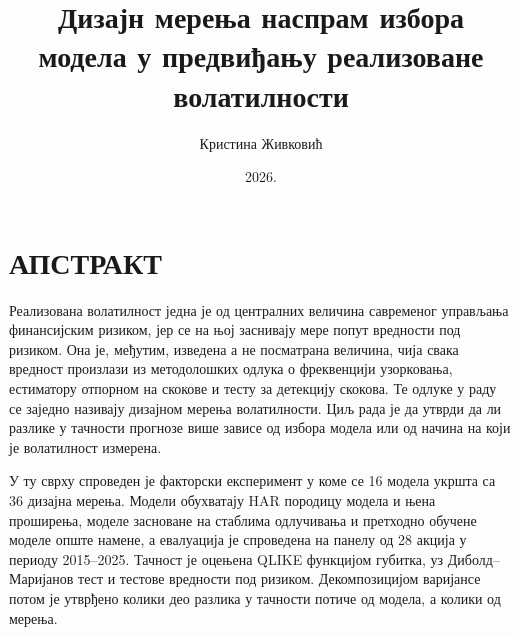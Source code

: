 \documentclass[12pt,a4paper,oneside]{report}
\title{Дизајн мерења наспрам избора модела у предвиђању реализоване волатилности}
\author{Кристина Живковић}
\date{2026.}
\begin{document}


\chapter*{АПСТРАКТ}

Реализована волатилност једна је од централних величина савременог управљања
финансијским ризиком, јер се на њој заснивају мере попут вредности под ризиком. Она је,
међутим, изведена а не посматрана величина, чија свака вредност произлази из
методолошких одлука о фреквенцији узорковања, естиматору отпорном на скокове и тесту за
детекцију скокова. Те одлуке у раду се заједно називају дизајном мерења волатилности.
Циљ рада је да утврди да ли разлике у тачности прогнозе више зависе од избора модела
или од начина на који је волатилност измерена.

У ту сврху спроведен је факторски експеримент у коме се 16 модела укршта са
36 дизајна мерења. Модели обухватају HAR породицу модела и њена проширења,
моделе засноване на стаблима одлучивања и претходно обучене моделе опште намене, а
евалуација је спроведена на панелу од 28 акција у периоду 2015–2025. Тачност
је оцењена QLIKE функцијом губитка, уз Диболд–Маријанов тест и тестове вредности под
ризиком. Декомпозицијом варијансе потом је утврђено колики део разлика у тачности
потиче од модела, а колики од мерења.
\end{document}
